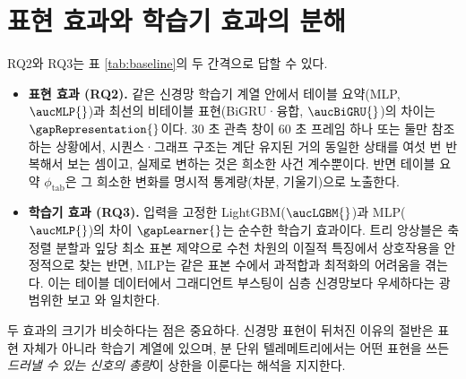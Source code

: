 
\section{표현 효과와 학습기 효과의 분해}
\label{sec:results-decomp}

RQ2와 RQ3는 표 \ref{tab:baseline}의 두 간격으로 답할 수 있다.

\begin{itemize}[leftmargin=1.5em]
  \item \textbf{표현 효과 (RQ2).} 같은 신경망 학습기 계열 안에서 테이블 요약(MLP, $\aucMLP{}$)과 최선의 비테이블 표현(BiGRU·융합, $\aucBiGRU{}$)의 차이는 $\gapRepresentation{}$이다. 30 초 관측 창이 60 초 프레임 하나 또는 둘만 참조하는 상황에서, 시퀀스·그래프 구조는 계단 유지된 거의 동일한 상태를 여섯 번 반복해서 보는 셈이고, 실제로 변하는 것은 희소한 사건 계수뿐이다. 반면 테이블 요약 $\phi_{\mathrm{tab}}$은 그 희소한 변화를 명시적 통계량(차분, 기울기)으로 노출한다.
  \item \textbf{학습기 효과 (RQ3).} 입력을 고정한 LightGBM($\aucLGBM{}$)과 MLP($\aucMLP{}$)의 차이 $\gapLearner{}$는 순수한 학습기 효과이다. 트리 앙상블은 축 정렬 분할과 잎당 최소 표본 제약으로 수천 차원의 이질적 특징에서 상호작용을 안정적으로 찾는 반면, MLP는 같은 표본 수에서 과적합과 최적화의 어려움을 겪는다. 이는 테이블 데이터에서 그래디언트 부스팅이 심층 신경망보다 우세하다는 광범위한 보고 \cite{grinsztajn2022why}와 일치한다.
\end{itemize}

두 효과의 크기가 비슷하다는 점은 중요하다. 신경망 표현이 뒤처진 이유의 절반은 표현 자체가 아니라 학습기 계열에 있으며, 분 단위 텔레메트리에서는 어떤 표현을 쓰든 \emph{드러낼 수 있는 신호의 총량}이 상한을 이룬다는 해석을 지지한다.
